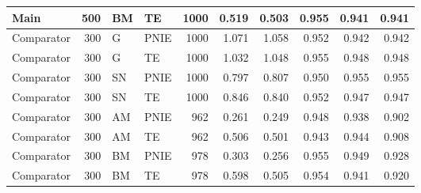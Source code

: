 \begin{table}[htbp]
\begin{tabular}{lrllrrrrrr}
Main & 500 & BM & TE & 1000 & 0.519 & 0.503 & 0.955 & 0.941 & 0.941 \\
\midrule
Comparator & 300 & G & PNIE & 1000 & 1.071 & 1.058 & 0.952 & 0.942 & 0.942 \\
Comparator & 300 & G & TE & 1000 & 1.032 & 1.048 & 0.955 & 0.948 & 0.948 \\
\midrule
Comparator & 300 & SN & PNIE & 1000 & 0.797 & 0.807 & 0.950 & 0.955 & 0.955 \\
Comparator & 300 & SN & TE & 1000 & 0.846 & 0.840 & 0.952 & 0.947 & 0.947 \\
\midrule
Comparator & 300 & AM & PNIE & 962 & 0.261 & 0.249 & 0.948 & 0.938 & 0.902 \\
Comparator & 300 & AM & TE & 962 & 0.506 & 0.501 & 0.943 & 0.944 & 0.908 \\
\midrule
Comparator & 300 & BM & PNIE & 978 & 0.303 & 0.256 & 0.955 & 0.949 & 0.928 \\
Comparator & 300 & BM & TE & 978 & 0.598 & 0.505 & 0.954 & 0.941 & 0.920 \\
\bottomrule\end{tabular}\end{table}
